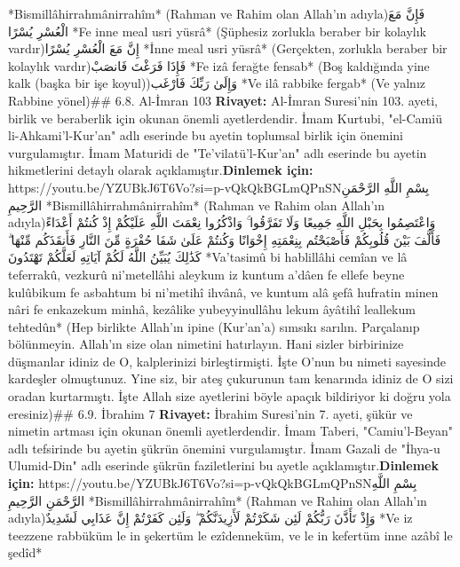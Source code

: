\documentclass[12pt,a4paper]{article}
\begin{document}
{*Bismillâhirrahmânirrahîm*
(Rahman ve Rahim olan Allah'ın adıyla)فَإِنَّ مَعَ الْعُسْرِ يُسْرًا
*Fe inne meal usri yüsrâ*
(Şüphesiz zorlukla beraber bir kolaylık vardır)إِنَّ مَعَ الْعُسْرِ يُسْرًا
*İnne meal usri yüsrâ*
(Gerçekten, zorlukla beraber bir kolaylık vardır)فَإِذَا فَرَغْتَ فَانصَبْ
*Fe izâ ferağte fensab*
(Boş kaldığında yine kalk (başka bir işe koyul))وَإِلَىٰ رَبِّكَ فَارْغَب
*Ve ilâ rabbike fergab*
(Ve yalnız Rabbine yönel)\#\# 6.8. Al-İmran 103
\textbf{Rivayet:} Al-İmran Suresi'nin 103. ayeti, birlik ve beraberlik için okunan önemli ayetlerdendir. İmam Kurtubi, "el-Camiü li-Ahkami'l-Kur'an" adlı eserinde bu ayetin toplumsal birlik için önemini vurgulamıştır. İmam Maturidi de "Te'vilatü'l-Kur'an" adlı eserinde bu ayetin hikmetlerini detaylı olarak açıklamıştır.\textbf{Dinlemek için:} https://youtu.be/YZUBkJ6T6Vo?si=p-vQkQkBGLmQPnSNبِسْمِ اللَّهِ الرَّحْمَنِ الرَّحِيمِ
*Bismillâhirrahmânirrahîm*
(Rahman ve Rahim olan Allah'ın adıyla)وَاعْتَصِمُوا بِحَبْلِ اللَّهِ جَمِيعًا وَلَا تَفَرَّقُوا ۚ وَاذْكُرُوا نِعْمَتَ اللَّهِ عَلَيْكُمْ إِذْ كُنتُمْ أَعْدَاءً فَأَلَّفَ بَيْنَ قُلُوبِكُمْ فَأَصْبَحْتُم بِنِعْمَتِهِ إِخْوَانًا وَكُنتُمْ عَلَىٰ شَفَا حُفْرَةٍ مِّنَ النَّارِ فَأَنقَذَكُم مِّنْهَا ۗ كَذَٰلِكَ يُبَيِّنُ اللَّهُ لَكُمْ آيَاتِهِ لَعَلَّكُمْ تَهْتَدُونَ
*Va'tasimû bi hablillâhi cemîan ve lâ teferrakû, vezkurû ni'metellâhi aleykum iz kuntum a'dâen fe ellefe beyne kulûbikum fe asbahtum bi ni'metihî ihvânâ, ve kuntum alâ şefâ hufratin minen nâri fe enkazekum minhâ, kezâlike yubeyyinullâhu lekum âyâtihî leallekum tehtedûn*
(Hep birlikte Allah'ın ipine (Kur'an'a) sımsıkı sarılın. Parçalanıp bölünmeyin. Allah'ın size olan nimetini hatırlayın. Hani sizler birbirinize düşmanlar idiniz de O, kalplerinizi birleştirmişti. İşte O'nun bu nimeti sayesinde kardeşler olmuştunuz. Yine siz, bir ateş çukurunun tam kenarında idiniz de O sizi oradan kurtarmıştı. İşte Allah size ayetlerini böyle apaçık bildiriyor ki doğru yola eresiniz)\#\# 6.9. İbrahim 7
\textbf{Rivayet:} İbrahim Suresi'nin 7. ayeti, şükür ve nimetin artması için okunan önemli ayetlerdendir. İmam Taberi, "Camiu'l-Beyan" adlı tefsirinde bu ayetin şükrün önemini vurgulamıştır. İmam Gazali de "İhya-u Ulumid-Din" adlı eserinde şükrün faziletlerini bu ayetle açıklamıştır.\textbf{Dinlemek için:} https://youtu.be/YZUBkJ6T6Vo?si=p-vQkQkBGLmQPnSNبِسْمِ اللَّهِ الرَّحْمَنِ الرَّحِيمِ
*Bismillâhirrahmânirrahîm*
(Rahman ve Rahim olan Allah'ın adıyla)وَإِذْ تَأَذَّنَ رَبُّكُمْ لَئِن شَكَرْتُمْ لَأَزِيدَنَّكُمْ ۖ وَلَئِن كَفَرْتُمْ إِنَّ عَذَابِي لَشَدِيدٌ
*Ve iz teezzene rabbüküm le in şekertüm le ezîdenneküm, ve le in kefertüm inne azâbî le şedîd*
}
\end{document}
